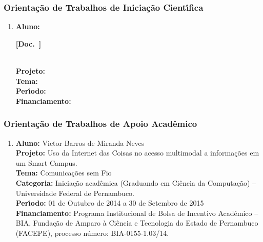 \documentclass[a4paper,oneside,10pt]{article}
\newcounter{document}%
\newcommand\Doc{{\addtocounter{document}{1}\mbox{\sffamily\bfseries [Doc. \arabic{document}]}}}
\begin{document}

\subsubsection{Orienta\c{c}\~{a}o de Trabalhos de Inicia\c{c}\~{a}o Cient\'{\i}fica}
\vspace{0.3cm}

\begin{enumerate}
\renewcommand{\labelenumi}{{\large\bfseries\arabic{enumi}.}}

\item   \textbf{Aluno:}  \Doc \\
        \textbf{Projeto:}  \\
        \textbf{Tema:}  \\
        \textbf{Per\'{\i}odo:}  \\
        \textbf{Financiamento:} 

\end{enumerate}


\subsubsection{Orienta\c{c}\~{a}o de Trabalhos de Apoio Acad\^{e}mico}
\vspace{0.3cm}

\begin{enumerate}
\renewcommand{\labelenumi}{{\large\bfseries\arabic{enumi}.}}

\item   \textbf{Aluno:} Victor Barros de Miranda Neves \mbox{}\\
        \textbf{Projeto:} Uso da Internet das Coisas no acesso multimodal a informações em um Smart Campus.\\
        \textbf{Tema:} Comunica\c{c}\~{o}es sem Fio \\
        \textbf{Categoria:} Iniciação acadêmica (Graduando em Ciência da Computação) – Universidade Federal de Pernambuco.\\
        \textbf{Per\'{\i}odo:} 01 de Outubro de 2014 a 30 de Setembro de 2015 \\
        \textbf{Financiamento:} Programa Institucional de Bolsa de Incentivo Acadêmico – BIA, Fundação de Amparo à Ciência e Tecnologia do Estado de Pernambuco (FACEPE), processo número: BIA-0155-1.03/14.

\end{enumerate}
\end{document}
